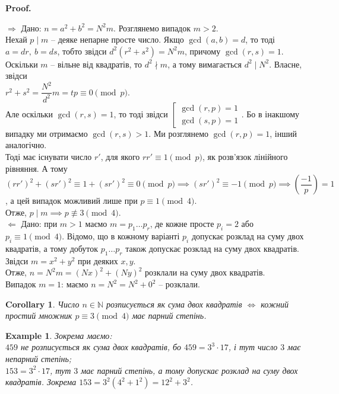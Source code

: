 \documentclass[a4paper, 10pt]{article}
\makeatletter
\theoremstyle{theoremdd}
\theoremstyle{theoremdd}
\theoremstyle{theoremdd}
\theoremstyle{theoremdd}
\newtheorem{example}[theorem]{Example}
\theoremstyle{theoremdd}
\theoremstyle{theoremdd}
\theoremstyle{theoremdd}
\theoremstyle{theoremdd}
\newtheorem{corollary}[theorem]{Corollary}
\def\rightproof{$\boxed{\Rightarrow}$ }
\def\leftproof{$\boxed{\Leftarrow}$ }
\renewenvironment{proof}[1][Proof.\\]{\par
\pushQED{\hfill \qed}%
\normalfont \topsep6\p@\@plus6\p@\relax
\trivlist
\item\relax
{\bfseries
#1\@addpunct{.}}\hspace\labelsep\ignorespaces
}{%
\popQED\endtrivlist\@endpefalse
}
\makeatother
\begin{document}
\begin{proof}
\rightproof Дано: $n = a^2+b^2 = N^2m$. Розглянемо випадок $m > 2$.\\
Нехай $p \mid m$ -- деяке непарне просте число. Якщо $\gcd(a,b) = d$, то тоді $a = dr,\ b = ds$, тобто звідси $d^2(r^2+s^2) = N^2m$, причому $\gcd(r,s)=1$.\\
Оскільки $m$ -- вільне від квадратів, то $d^2 \nmid m$, а тому вимагається $d^2 \mid N^2$. Власне, звідси\\
$r^2+s^2 = \dfrac{N^2}{d^2}m = tp \equiv 0 \pmod p$.\\
Але оскільки $\gcd(r,s) = 1$, то тоді звідси $\left[ \begin{gathered} \gcd(r,p)=1 \\ \gcd(s,p)=1 \end{gathered} \right.$. Бо в інакшому випадку ми отримаємо $\gcd(r,s) > 1$. Ми розглянемо $\gcd(r,p) = 1$, інший аналогічно.\\
Тоді має існувати число $r'$, для якого $rr' \equiv 1 \pmod p$, як розв'язок лінійного рівняння. А тому\\
$(rr')^2 + (sr')^2 \equiv 1 + (sr')^2 \equiv 0 \pmod p \implies (sr')^2 \equiv -1 \pmod p \implies \left( \dfrac{-1}{p} \right) = 1$, а цей випадок можливий лише при $p \equiv 1 \pmod 4$.\\
Отже, $p \mid m \implies p \not\equiv 3 \pmod 4$.
\bigskip \\
\leftproof Дано: при $m > 1$ маємо $m = p_1 \dots p_r$, де кожне просте $p_i = 2$ або $p_i \equiv 1 \pmod 4$. Відомо, що в кожному варіанті $p_i$ допускає розклад на суму двох квадратів, а тому добуток $p_1 \dots p_r$ також допускає розклад на суму двох квадратів. Звідси $m = x^2+y^2$ при деяких $x,y$.\\
Отже, $n = N^2m = (Nx)^2 + (Ny)^2$ розклали на суму двох квадратів.\\
Випадок $m = 1$: маємо $n = N^2 = N^2 + 0^2$ -- розклали.
\end{proof}

\begin{corollary}
Число $n \in \mathbb{N}$ розписується як сума двох квадратів $\iff$ кожний простий множник $p \equiv 3 \pmod 4$ має парний степінь.
\end{corollary}

\begin{example}
Зокрема маємо:\\
$459$ не розписується як сума двох квадратів, бо $459 = 3^3 \cdot 17$, і тут число $3$ має непарний степінь;\\
$153 = 3^2 \cdot 17$, тут $3$ має парний степінь, а тому допускає розклад на суму двох квадратів. Зокрема $153 = 3^2 (4^2+1^2) = 12^2 + 3^2$. 
\end{example}
\end{document}
